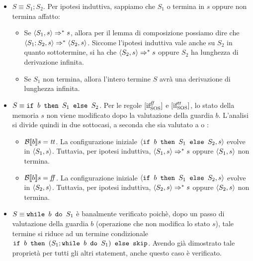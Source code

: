 \begin{itemize}
  \item $S \equiv{} S_1; S_2$. Per ipotesi induttiva, sappiamo che $S_1$ o
  termina in $s$ oppure non termina affatto:
  \begin{itemize}
    \item Se $\confSs{S_1}{s} \Rar{*} s$, allora per il lemma di composizione
      possiamo dire che $\confSs{S_1;S_2}{s} \Rar{*} \confSs{S_2}{s}$. Siccome
      l'ipotesi induttiva vale anche su $S_2$ in quanto sottotermine, si ha che
      $\confSs{S_2}{s} \Rar{*} s$ oppure $S_2$ ha lunghezza di derivazione
      infinita.
    \item Se $S_1$ non termina, allora l'intero termine $S$ avrà una
      derivazione di lunghezza infinita.
  \end{itemize}

  \item $S \equiv{} \ifABC{b}{S_1}{S_2}$. Per le regole $\ifffSOS{}$ e
    $\ifttSOS{}$, lo stato della memoria $s$ non viene modificato dopo la
    valutazione della guardia $b$. L'analisi si divide quindi in due sottocasi,
    a seconda che  sia valutato a \semtrue{} o \semfalse{}:
    \begin{itemize}
      \item $\B{b} = \semtrue{}$. La configurazione iniziale
        $\confSs{\ifABC{b}{S_1}{S_2}}{s}$ evolve in
        $\confSs{S_1}{s}$. Tuttavia, per ipotesi induttiva,
        $\confSs{S_1}{s} \Rar{*} s$ oppure $\confSs{S_1}{s}$ non termina.
      \item $\B{b} = \semfalse{}$. La configurazione iniziale
        $\confSs{\ifABC{b}{S_1}{S_2}}{s}$ evolve in
        $\confSs{S_2}{s}$. Tuttavia, per ipotesi induttiva,
        $\confSs{S_2}{s} \Rar{*} s$ oppure $\confSs{S_2}{s}$ non termina.
    \end{itemize}

  \item $S \equiv{} \wbS{b}{S_1}$ è banalmente verificato poichè, dopo un passo
    di valutazione della guardia $b$ (operazione che non modifica lo stato $s$),
    tale termine si riduce ad un termine condizionale
    $\ifABC{b}{(S_1;\wbS{b}{S_1})}{\skipForFriends}$. Avendo già dimostrato tale
    proprietà per tutti gli altri statement, anche questo caso è verificato.
\end{itemize}

\undef{\stmm}
